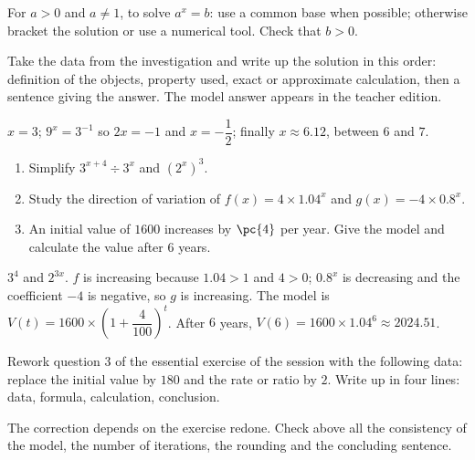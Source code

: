 \begin{summary}For $a>0$ and $a\neq1$, to solve $a^x=b$: use a common base when possible; otherwise bracket the solution or use a numerical tool. Check that $b>0$.\end{summary}

\begin{example}
Take the data from the investigation and write up the solution in this order: definition of the objects, property used, exact or approximate calculation, then a sentence giving the answer. The model answer appears in the teacher edition.
\end{example}
\begin{solution}$x=3$; $9^x=3^{-1}$ so $2x=-1$ and $x=-\dfrac12$; finally $x\approx\num{6,12}$, between $6$ and $7$.\end{solution}

\begin{exercise}[essential]
\begin{enumerate}\item Simplify $3^{x+4}\div3^x$ and $(2^x)^3$.\item Study the direction of variation of $f(x)=4\times\num{1,04}^x$ and $g(x)=-4\times\num{0,8}^x$.\item An initial value of $1600$ increases by $\pc{4}$ per year. Give the model and calculate the value after $6$ years.\end{enumerate}
\end{exercise}
\begin{solution}$3^4$ and $2^{3x}$. $f$ is increasing because $\num{1,04}>1$ and $4>0$; $\num{0,8}^x$ is decreasing and the coefficient $-4$ is negative, so $g$ is increasing. The model is $V(t)=1600\times\left(1+\dfrac{4}{100}\right)^t$. After $6$ years, $V(6)=1600\times\num{1,04}^6\approx\num{2024,51}$.\end{solution}


\begin{homework}Rework question 3 of the essential exercise of the session with the following data: replace the initial value by $180$ and the rate or ratio by $2$. Write up in four lines: data, formula, calculation, conclusion.\end{homework}
\begin{solution}The correction depends on the exercise redone. Check above all the consistency of the model, the number of iterations, the rounding and the concluding sentence.\end{solution}

